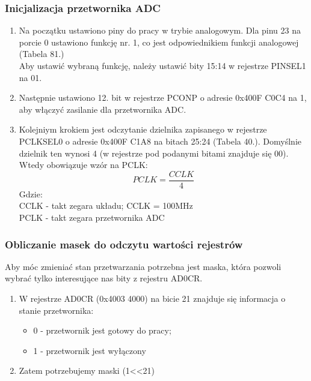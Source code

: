 \subsubsection{Inicjalizacja przetwornika ADC}
    \begin{enumerate}
        \item Na początku ustawiono piny do pracy w trybie analogowym. Dla pinu 23 na porcie 0 ustawiono funkcję nr. 1, co jest odpowiednikiem funkcji analogowej (Tabela 81.) \\%
              Aby ustawić wybraną funkcję, należy ustawić bity 15:14 w rejestrze PINSEL1 na 01.
        \item Następnie ustawiono 12. bit w rejestrze PCONP o adresie 0x400F C0C4 na 1, aby włączyć zasilanie dla przetwornika ADC.
        \item Kolejniym krokiem jest odczytanie dzielnika zapisanego w rejestrze PCLKSEL0 o adresie 0x400F C1A8 na bitach 25:24 (Tabela 40.). Domyślnie dzielnik ten wynosi 4 (w rejestrze pod podanymi bitami znajduje się 00). Wtedy obowiązuje wzór na PCLK:
        \[
        PCLK = \frac{CCLK}{4}
        \]
        Gdzie:\\
        CCLK - takt zegara układu; CCLK = 100MHz\\
        PCLK - takt zegara przetwornika ADC\\
        
    \end{enumerate}

\subsubsection{Obliczanie masek do odczytu wartości rejestrów}
        Aby móc zmieniać stan przetwarzania potrzebna jest maska, która pozwoli wybrać tylko interesujące nas bity z rejestru AD0CR.
        \begin{enumerate}
            \item W rejestrze AD0CR (0x4003 4000) na bicie 21 znajduje się informacja o stanie przetwornika:
            \begin{itemize}
                \item 0 - przetwornik jest gotowy do pracy;
                \item 1 - przetwornik jest wyłączony
            \end{itemize}
            \item Zatem potrzebujemy maski (1<<21)
        \end{enumerate}
